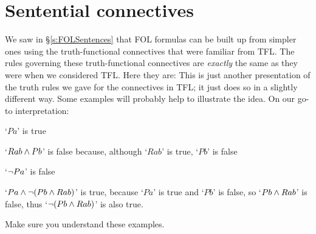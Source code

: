 \section{Sentential connectives}
We saw in \S\ref{s:FOLSentences} that FOL formulas can be built up from simpler ones using the truth-functional connectives that were familiar from TFL. The rules governing these truth-functional connectives are \emph{exactly} the same as they were when we considered TFL. Here they are:
This is just another presentation of the truth rules we gave for the connectives in TFL; it just does so in a slightly different way. Some examples will probably help to illustrate the idea. On our go-to interpretation:
	\begin{earg}
		\item[\textbullet] `$Pa$' is true
		\item[\textbullet] `$Rab \mathbin{\wedge} Pb$' is false because, although `$Rab$' is true, `$Pb$' is false
		\item[\textbullet] `$\neg Pa$' is false
		\item[\textbullet] `$Pa \mathbin{\wedge} \neg(Pb\mathbin{\wedge} Rab)$' is true, because `$Pa$' is true and `$Pb$' is false, so `$Pb\mathbin{\wedge} Rab$' is false, thus `$\neg (Pb\mathbin{\wedge} Rab)$' is also true.
	\end{earg}
Make sure you understand these examples.

